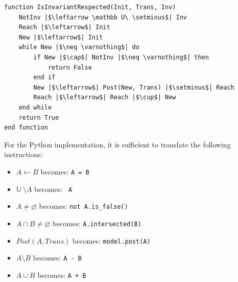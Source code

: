 \documentclass[12pt]{article}
\begin{document}
    \begin{verbatim}
function IsInvariantRespected(Init, Trans, Inv)
    NotInv |$\leftarrow \mathbb U\ \setminus$| Inv
    Reach |$\leftarrow$| Init
    New |$\leftarrow$| Init
    while New |$\neq \varnothing$| do
        if New |$\cap$| NotInv |$\neq \varnothing$| then
            return False
        end if
        New |$\leftarrow$| Post(New, Trans) |$\setminus$| Reach
        Reach |$\leftarrow$| Reach |$\cup$| New
    end while
    return True
end function
    \end{verbatim}
    For the Python implementation, it is sufficient to translate the following instructions:
    \begin{itemize}
        \item $A \leftarrow B$ becomes: \texttt{A = B}
        \item $\mathbb U\ \setminus A$ becomes: \texttt{~A}
        \item $A \neq \varnothing$ becomes: \texttt{not A.is_false()}
        \item $A \cap B \neq \varnothing$ becomes: \texttt{A.intersected(B)}
        \item $Post(A, Trans)$ becomes: \texttt{model.post(A)}
        \item $A \setminus B$ becomes: \texttt{A - B}
        \item $A \cup B$ becomes: \texttt{A + B}
    \end{itemize}
\end{document}
